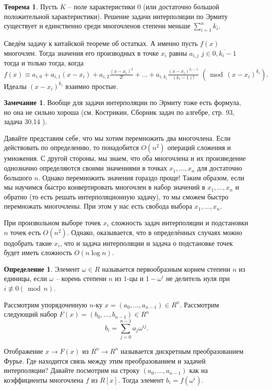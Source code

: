\documentclass[10pt,a4paper,oneside]{book} %
\theoremstyle{definition}
\newtheorem*{rem}{Замечание}
\newtheorem*{defn}{Определение}
\newtheorem{thm}{Теорема}
\renewcommand{\mod}{\,\operatorname{mod}\,}
\newcommand{\ovl}{\overline}
\newcommand{\nequiv}{\not \equiv}
\def\thrm{\begin{thm}}
\def\ethrm{\end{thm}}
\def\dfn{\begin{defn}}
\def\edfn{\end{defn}}
\def\rm{\begin{rem}}
\def\erm{\end{rem}}
\begin{document}
\thrm Пусть $K$ -- поле характеристики 0 (или достаточно большой положительной характеристики). Решение задачи интерполяции по Эрмиту существует и единственно среди многочленов степени меньше $\sum_{i=1}^n k_i$.
\ethrm
\proof Сведём задачу к китайской теореме об остатках. А именно пусть $f(x)$ многочлен. Тогда значения его производных в точке $x_i$ равны $a_{i,j}$ $j\in \ovl{0,k_i-1}$ тогда и только тогда, когда
$$f(x)\equiv a_{i,0}+a_{i,1}(x-x_i)+a_{i,2}\tfrac{(x-x_i)^2}{2!}+\dots+ a_{i,k_i}\tfrac{(x-x_i)^{k_i-1}}{(k_i-1)!}\,\, (\mod (x-x_i)^{k_i}).$$
Идеалы $(x-x_i)^{k_i}$ взаимно простые.
\endproof

\rm Вообще для  задачи интерполяции по Эрмиту тоже есть формула, но она не сильно хороша (см. Кострикин, Сборник задач по алгебре, стр. 93, задача 30.14 ).\erm


Давайте представим себе, что мы хотим перемножить два многочлена. Если действовать по определению, то понадобится $O(n^2)$ операций сложения и умножения. С другой стороны, мы знаем, что оба многочлена и их произведение однозначно определяются своими значениями в точках $x_1,\dots, x_n$ для достаточно большого $n$. Однако перемножить значения гораздо проще! Таким образом, если мы научимся быстро конвертировать многочлен в набор значений в $x_1,\dots, x_n$ и обратно (то есть решать интерполяционную задачу), то мы сможем быстро перемножать многочлены. При этом у нас есть свобода выбора $x_1,\dots, x_n$.

При произвольном выборе точек $x_i$ сложность задач интерполяции и подстановки $n$ точек есть $O(n^2)$. Однако, оказывается, что в определённых случаях можно подобрать такие $x_i$, что и задача интерполяции и задача о подстановке точек будет иметь сложность $O(n\log n)$.

\dfn Элемент  $\omega \in R$ называется первообразным корнем  степени $n$ из единицы, если $\omega$ -- корень степени $n$ из $1$-цы и $1-\omega^i$ не делитель нуля при $i\nequiv 0(\mod n)$.
\edfn




Рассмотрим упорядоченную $n$-ку $x=(a_0,\dots,a_{n-1})\in R^n$. Рассмотрим следующий набор $F(x)=(b_0,\dots,b_{n-1})\in R^n$
$$b_i=\sum_{j=0}^{n-1} a_j \omega^{ij}.$$

Отображение $x \to F(x)$ из $ R^n \to R^n$ называется дискретным преобразованием Фурье. Где находится связь между этим преобразованием и задачей интерполяции? Давайте посмотрим на строку $(a_0,\dots,a_{n-1})$ как на коэффициенты многочлена $f$ из $R[x]$. Тогда элемент $b_i=f(\omega^i)$.
\end{document}
